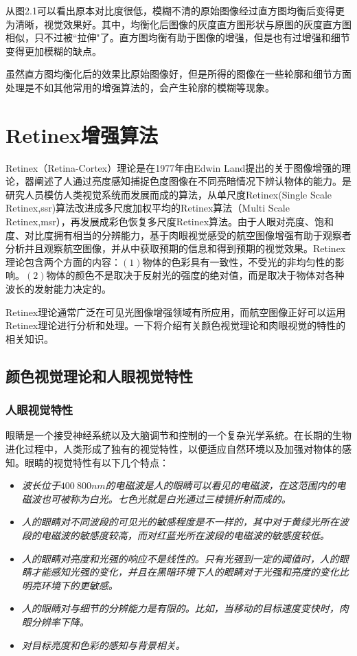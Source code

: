 从图2.1可以看出原本对比度很低，模糊不清的原始图像经过直方图均衡后变得更为清晰，视觉效果好。其中，均衡化后图像的灰度直方图形状与原图的灰度直方图相似，只不过被“拉伸"了。直方图均衡有助于图像的增强，但是也有过增强和细节变得更加模糊的缺点。

虽然直方图均衡化后的效果比原始图像好，但是所得的图像在一些轮廓和细节方面处理是不如其他常用的增强算法的，会产生轮廓的模糊等现象。
		\section{Retinex增强算法}	Retinex（Retina-Cortex）理论是在1977年由Edwin Land提出的关于图像增强的理论，器阐述了人通过亮度感知捕捉色度图像在不同亮暗情况下辨认物体的能力。是研究人员模仿人类视觉系统而发展而成的算法，从单尺度Retinex(Single Scale Retinex,ssr)算法改进成多尺度加权平均的Retinex算法（Multi Scale Retinex,msr），再发展成彩色恢复多尺度Retinex算法。由于人眼对亮度、饱和度、对比度拥有相当的分辨能力，基于肉眼视觉感受的航空图像增强有助于观察者分析并且观察航空图像，并从中获取预期的信息和得到预期的视觉效果。Retinex理论包含两个方面的内容：$(1)$物体的色彩具有一致性，不受光的非均匀性的影响。$(2)$物体的颜色不是取决于反射光的强度的绝对值，而是取决于物体对各种波长的发射能力决定的。

Retinex理论通常广泛在可见光图像增强领域有所应用，而航空图像正好可以运用Retinex理论进行分析和处理。一下将介绍有关颜色视觉理论和肉眼视觉的特性的相关知识。
			\subsection{颜色视觉理论和人眼视觉特性}
				\subsubsection{人眼视觉特性}眼睛是一个接受神经系统以及大脑调节和控制的一个复杂光学系统。在长期的生物进化过程中，人类形成了独有的视觉特性，以便适应自然环境以及加强对物体的感知。眼睛的视觉特性有以下几个特点：
				\begin{itemize}
					\item \emph{波长位于$400~800nm$的电磁波是人的眼睛可以看见的电磁波，在这范围内的电磁波也可被称为白光。七色光就是白光通过三棱镜折射而成的。}
					\item \emph{人的眼睛对不同波段的可见光的敏感程度是不一样的，其中对于黄绿光所在波段的电磁波的敏感度较高，而对红蓝光所在波段的电磁波的敏感度较低。}
					\item \emph{人的眼睛对亮度和光强的响应不是线性的。只有光强到一定的阈值时，人的眼睛才能感知光强的变化，并且在黑暗环境下人的眼睛对于光强和亮度的变化比明亮环境下的更敏感。}
					\item \emph{人的眼睛对与细节的分辨能力是有限的。比如，当移动的目标速度变快时，肉眼分辨率下降。}
					\item \emph{对目标亮度和色彩的感知与背景相关。}
				\end{itemize}

